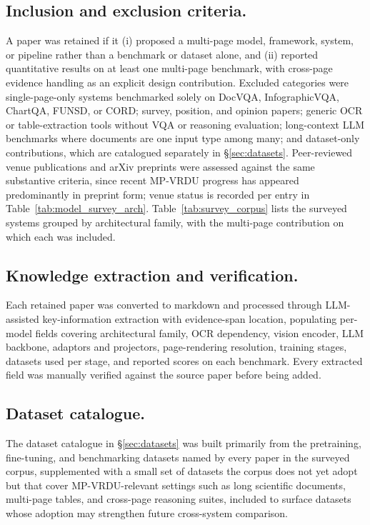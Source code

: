 \subsection{Inclusion and exclusion criteria.}
A paper was retained if it (i) proposed a multi-page model, framework, system, or pipeline rather than a benchmark or dataset alone, and (ii) reported quantitative results on at least one multi-page benchmark, with cross-page evidence handling as an explicit design contribution. Excluded categories were single-page-only systems benchmarked solely on DocVQA, InfographicVQA, ChartQA, FUNSD, or CORD; survey, position, and opinion papers; generic OCR or table-extraction tools without VQA or reasoning evaluation; long-context LLM benchmarks where documents are one input type among many; and dataset-only contributions, which are catalogued separately in \S\ref{sec:datasets}. Peer-reviewed venue publications and arXiv preprints were assessed against the same substantive criteria, since recent MP-VRDU progress has appeared predominantly in preprint form; venue status is recorded per entry in Table~\ref{tab:model_survey_arch}. Table~\ref{tab:survey_corpus} lists the surveyed systems grouped by architectural family, with the multi-page contribution on which each was included.

\subsection{Knowledge extraction and verification.}
Each retained paper was converted to markdown and processed through LLM-assisted key-information extraction with evidence-span location, populating per-model fields covering architectural family, OCR dependency, vision encoder, LLM backbone, adaptors and projectors, page-rendering resolution, training stages, datasets used per stage, and reported scores on each benchmark. Every extracted field was manually verified against the source paper before being added.

\subsection{Dataset catalogue.}
The dataset catalogue in \S\ref{sec:datasets} was built primarily from the pretraining, fine-tuning, and benchmarking datasets named by every paper in the surveyed corpus, supplemented with a small set of datasets the corpus does not yet adopt but that cover MP-VRDU-relevant settings such as long scientific documents, multi-page tables, and cross-page reasoning suites, included to surface datasets whose adoption may strengthen future cross-system comparison.

